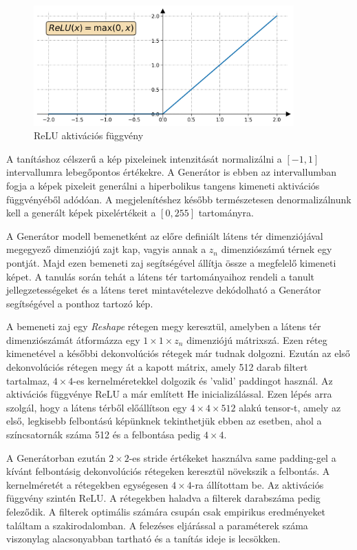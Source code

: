 \begin{figure}[h]
\centering
\includegraphics[width=10cm]{images/relu.png}
\caption{ReLU aktivációs függvény}
\label{fig:relu}
\end{figure}

A tanításhoz célszerű a kép pixeleinek intenzitását normalizálni a $[-1, 1]$ intervallumra lebegőpontos értékekre. A Generátor is ebben az intervallumban fogja a képek pixeleit generálni a hiperbolikus tangens kimeneti aktivációs függvényéből adódóan. A megjelenítéshez később természetesen denormalizálnunk kell a generált képek pixelértékeit a $[0, 255]$ tartományra.

A Generátor modell bemenetként az előre definiált látens tér dimenziójával megegyező dimenziójú zajt kap, vagyis annak a $z_n$ dimenziószámú térnek egy pontját. Majd ezen bemeneti zaj segítségével állítja össze a megfelelő kimeneti képet. A tanulás során tehát a látens tér tartományaihoz rendeli a tanult jellegzetességeket és a látens teret mintavételezve dekódolható a Generátor segítségével a ponthoz tartozó kép.

A bemeneti zaj egy \textit{Reshape} rétegen megy keresztül, amelyben a látens tér dimenziószámát átformázza egy $1 \times 1 \times z_n$ dimenziójú mátrixszá. Ezen réteg kimenetével a későbbi dekonvolúciós rétegek már tudnak dolgozni.
Ezután az első dekonvolúciós rétegen megy át a kapott mátrix, amely 512 darab filtert tartalmaz, $4 \times 4$-es kernelméretekkel dolgozik és 'valid' paddingot használ. Az aktivációs függvénye ReLU a már említett He inicializálással. Ezen lépés arra szolgál, hogy a látens térből előállítson egy $4 \times 4 \times 512$ alakú tensor-t, amely az első, legkisebb felbontású képünknek tekinthetjük ebben az esetben, ahol a színcsatornák száma 512 és a felbontása pedig $4 \times 4$.

A Generátorban ezután $2 \times 2$-es stride értékeket használva same padding-gel a kívánt felbontásig dekonvolúciós rétegeken keresztül növekszik a felbontás. A kernelméretét a rétegekben egységesen $4 \times 4$-ra állítottam be. Az aktivációs függvény szintén ReLU. A rétegekben haladva a filterek darabszáma pedig feleződik. A filterek optimális számára csupán csak empirikus eredményeket találtam a szakirodalomban. A felezéses eljárással a paraméterek száma viszonylag alacsonyabban tartható és a tanítás ideje is lecsökken.

